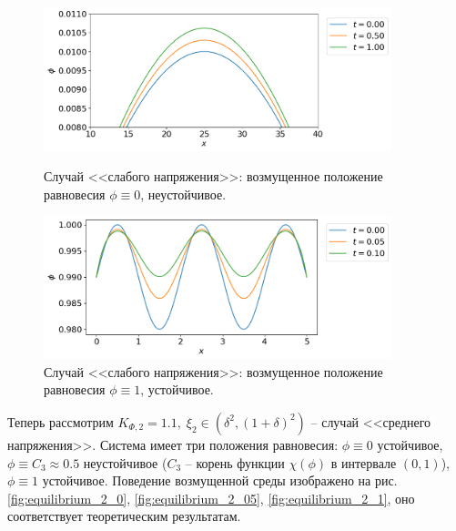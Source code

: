 \begin{figure}[!t]
	\centering
	\includegraphics[width=0.9\textwidth]{figures/equilibrium_1_0.png}
	\vspace{-0.3cm}
	\caption{Случай <<слабого напряжения>>: возмущенное положение равновесия $\phi \equiv 0$, неустойчивое.}
	\label{fig:equilibrium_1_0}
	\vspace{0.5cm}
	
	\includegraphics[width=0.9\textwidth]{figures/equilibrium_1_1.png}
	\vspace{-0.3cm}
	\caption{Случай <<слабого напряжения>>: возмущенное положение равновесия $\phi \equiv 1$, устойчивое.}
	\label{fig:equilibrium_1_1}
\end{figure}

Теперь рассмотрим $K_{\Phi, 2} = 1.1, \; \xi_2 \in (\delta^2, (1 + \delta)^2)$ -- случай <<среднего напряжения>>. Система имеет три положения равновесия: $\phi \equiv 0$ устойчивое, $\phi \equiv C_3 \approx 0.5$ неустойчивое ($C_3$ -- корень функции $\chi(\phi)$ в интервале $(0, 1)$), $\phi \equiv 1$ устойчивое. Поведение возмущенной среды изображено на \linebreak рис. \ref{fig:equilibrium_2_0}, \ref{fig:equilibrium_2_05}, \ref{fig:equilibrium_2_1}, оно соответствует теоретическим результатам.

